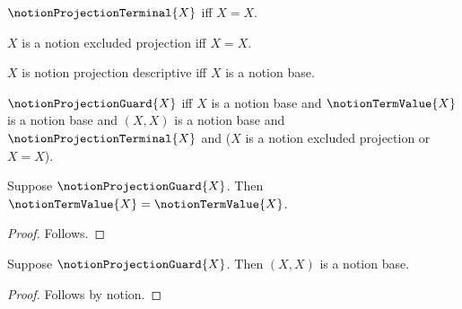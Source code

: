 

\begin{definition}\label{notion_projection_terminal}
    $\notionProjectionTerminal{X}$ iff $X=X$.
\end{definition}

\begin{definition}\label{notion_excluded_projection}
    $X$ is a notion excluded projection iff $X=X$.
\end{definition}

\begin{definition}\label{notion_projection_descriptive}
    $X$ is notion projection descriptive iff $X$ is a notion base.
\end{definition}

\begin{definition}\label{notion_projection_guard}
    $\notionProjectionGuard{X}$ iff
        $X$ is a notion base and
        $\notionTermValue{X}$ is a notion base and
        $(X,X)$ is a notion base and
        $\notionProjectionTerminal{X}$ and
        ($X$ is a notion excluded projection or $X=X$).
\end{definition}

\begin{proposition}\label{notion_projection_provider_use}
    Suppose $\notionProjectionGuard{X}$.
    Then $\notionTermValue{X}=\notionTermValue{X}$.
\end{proposition}
\begin{proof}
    Follows.
\end{proof}

\begin{proposition}\label{notion_projection_pair_use}
    Suppose $\notionProjectionGuard{X}$.
    Then $(X,X)$ is a notion base.
\end{proposition}
\begin{proof}
    Follows by notion.
\end{proof}
